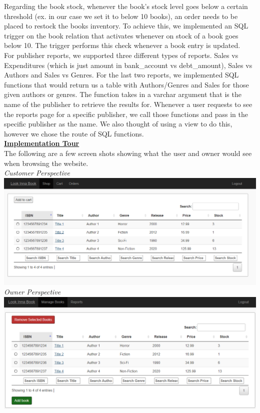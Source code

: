 \documentclass[a4 paper]{article}
\begin{document}
Regarding the book stock, whenever the book's stock level goes below a certain threshold (ex. in our case we set it to below 10 books), an order needs to be placed to restock the books inventory. To achieve this, we implemented an SQL trigger on the book relation that activates whenever on stock of a book goes below 10. The trigger performs this check whenever a book entry is updated.\\

For publisher reports, we supported three different types of reports. Sales vs Expenditures (which is just amount in bank\_account vs debt\_amount), Sales vs Authors and Sales vs Genres. For the last two reports, we implemented SQL functions that would return us a table with Authors/Genres and Sales for those given authors or genres. The function takes in a varchar argument that is the name of the publisher to retrieve the results for. Whenever a user requests to see the reports page for a specific publisher, we call those functions and pass in the specific publisher as the name. We also thought of using a view to do this, however we chose the route of SQL functions.\\

\underline{\textbf{Implementation Tour}}\\
The following are a few screen shots showing what the user and owner would see when browsing the website.\\

\noindent\emph{Customer Perspective}\\
\includegraphics[scale=0.5]{../Images/user_book_page.png}\\

\noindent\emph{Owner Perspective}\\
\includegraphics[scale=0.5]{../Images/owner_book_page.png}\\
\end{document}
